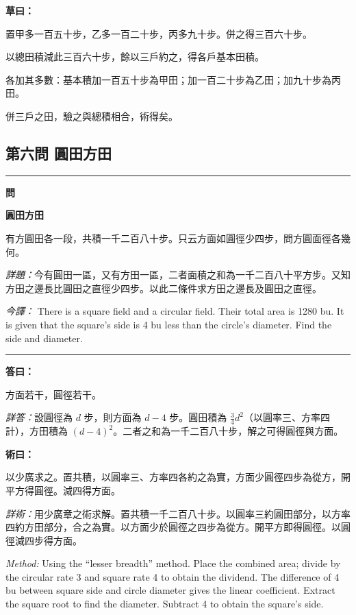 \documentclass[11pt,a4paper]{article}
\newenvironment{problem}[1][]{%
  \medskip\noindent\rule{\textwidth}{0.4pt}%
  \par\noindent\textbf{\color{sectioncolor}#1}\par\nopagebreak%
  \smallskip%
}{%
  \par\noindent\rule{\textwidth}{0.4pt}\medskip%
}
\newenvironment{answer}{%
  \medskip\noindent{\color{answercolor}\rule{0.5\textwidth}{0.5pt}}%
  \par\color{answercolor}%
}{%
  \par\medskip%
}
\newenvironment{method}{%
  \medskip\noindent{\color{methodcolor}\rule{0.5\textwidth}{0.5pt}}%
  \par\color{methodcolor}%
}{%
  \par\medskip%
}
\newenvironment{calculation}{%
  \medskip\noindent{\color{caocolor}\rule{0.4\textwidth}{0.4pt}}%
  \par\color{caocolor}%
}{%
  \par\medskip%
}
\begin{document}
\begin{calculation}
\textbf{草曰：}

置甲多一百五十步，乙多一百二十步，丙多九十步。併之得三百六十步。

以總田積減此三百六十步，餘以三戶約之，得各戶基本田積。

各加其多數：基本積加一百五十步為甲田；加一百二十步為乙田；加九十步為丙田。

併三戶之田，驗之與總積相合，術得矣。
\end{calculation}

\subsection*{第六問 圓田方田}

\begin{problem}[\textbf{問}]
\textbf{\color{sectioncolor}圓田方田}

有方圓田各一段，共積一千二百八十步。只云方面如圓徑少四步，問方圓面徑各幾何。

\medskip
\textit{詳題：}今有圓田一區，又有方田一區，二者面積之和為一千二百八十平方步。又知方田之邊長比圓田之直徑少四步。以此二條件求方田之邊長及圓田之直徑。

\medskip
\textit{今譯：} There is a square field and a circular field. Their total area is 1280 bu. It is given that the square's side is 4 bu less than the circle's diameter. Find the side and diameter.
\end{problem}

\begin{answer}
\textbf{答曰：}

方面若干，圓徑若干。

\medskip
\textit{詳答：}設圓徑為 $d$ 步，則方面為 $d-4$ 步。圓田積為 $\frac{3}{4}d^2$（以圓率三、方率四計），方田積為 $(d-4)^2$。二者之和為一千二百八十步，解之可得圓徑與方面。
\end{answer}

\begin{method}
\textbf{術曰：}

以少廣求之。置共積，以圓率三、方率四各約之為實，方面少圓徑四步為從方，開平方得圓徑。減四得方面。

\medskip
\textit{詳術：}用少廣章之術求解。置共積一千二百八十步。以圓率三約圓田部分，以方率四約方田部分，合之為實。以方面少於圓徑之四步為從方。開平方即得圓徑。以圓徑減四步得方面。

\medskip
\textit{Method:} Using the ``lesser breadth'' method. Place the combined area; divide by the circular rate 3 and square rate 4 to obtain the dividend. The difference of 4 bu between square side and circle diameter gives the linear coefficient. Extract the square root to find the diameter. Subtract 4 to obtain the square's side.
\end{method}
\end{document}
